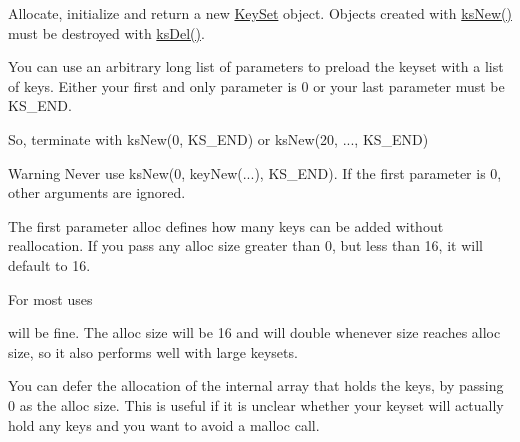Allocate, initialize and return a new \mbox{\hyperlink{classkdb_1_1KeySet}{Key\+Set}} object. Objects created with \mbox{\hyperlink{group__keyset_ga671e1aaee3ae9dc13b4834a4ddbd2c3c}{ks\+New()}} must be destroyed with \mbox{\hyperlink{group__keyset_ga27e5c16473b02a422238c8d970db7ac8}{ks\+Del()}}.

You can use an arbitrary long list of parameters to preload the keyset with a list of keys. Either your first and only parameter is 0 or your last parameter must be K\+S\+\_\+\+E\+ND.

So, terminate with ks\+New(0, K\+S\+\_\+\+E\+N\+D) or ks\+New(20, ..., K\+S\+\_\+\+E\+N\+D)

\begin{DoxyWarning}{Warning}
Never use ks\+New(0, key\+New(...), K\+S\+\_\+\+E\+N\+D). If the first parameter is 0, other arguments are ignored.
\end{DoxyWarning}
The first parameter {\ttfamily alloc} defines how many keys can be added without reallocation. If you pass any alloc size greater than 0, but less than 16, it will default to 16.

For most uses


\begin{DoxyCodeInclude}{0}
\DoxyCodeLine{\textcolor{comment}{// enough memory for up to 16 keys, without needing reallocation}}
\end{DoxyCodeInclude}
 will be fine. The alloc size will be 16 and will double whenever size reaches alloc size, so it also performs well with large keysets.

You can defer the allocation of the internal array that holds the keys, by passing 0 as the alloc size. This is useful if it is unclear whether your keyset will actually hold any keys and you want to avoid a malloc call.


